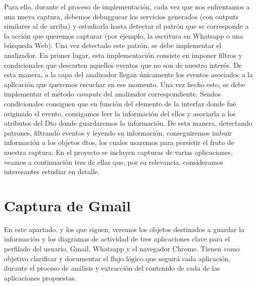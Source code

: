 \documentclass[12pt,a4paper,oneside]{book} %
\begin{document}
\newline \newline 
Para ello, durante el proceso de implementación, cada vez que nos enfrentamos a una nueva captura, debemos debugguear los servicios generados (con outputs similares al de arriba) y estudiarla hasta detectar el patrón que se corresponde a la acción que queremos capturar (por ejemplo, la escritura en Whatsapp o una búsqueda Web). 
\newline \newline 
Una vez detectado este patrón, se debe implementar el analizador. En primer lugar, esta implementación consiste en imponer filtros y condicionales que descarten aquellos eventos que no son de nuestro interés. De esta manera, a la capa del analizador llegan únicamente los eventos asociados a la aplicación que queremos escuchar en ese momento. 
\newline \newline
Una vez hecho esto, se debe implementar el método \textit{compute} del analizador correspondiente. Sendos condicionales consiguen que en función del elemento de la interfaz donde fué originado el evento, consigamos leer la información del ellos y asociarla a los atributos del Dto donde guardaremos la información. 
\newline \newline 
De esta manera, detectando patrones, filtrando eventos y leyendo su información, conseguiremos imbuir información a los objetos dtos, los cuales usaremos para persistir el fruto de nuestra captura. 
\newline \newline 
En el proyecto se incluyen capturas de varias aplicaciones, veamos a continuación tres de ellas que, por su relevancia, consideramos interesantes estudiar en detalle. 
\newpage 
\section{Captura de Gmail}
En este apartado, y los que siguen, veremos los objetos destinados a guardar la información y los diagramas de actividad de tres aplicaciones clave para el perfilado del usuario, Gmail, Whatsapp y el navegador Chrome. Tienen como objetivo clarificar y documentar el flujo lógico que seguirá cada aplicación, durante el proceso de análisis y extracción del contenido de cada de las aplicaciones propuestas.
\end{document}
